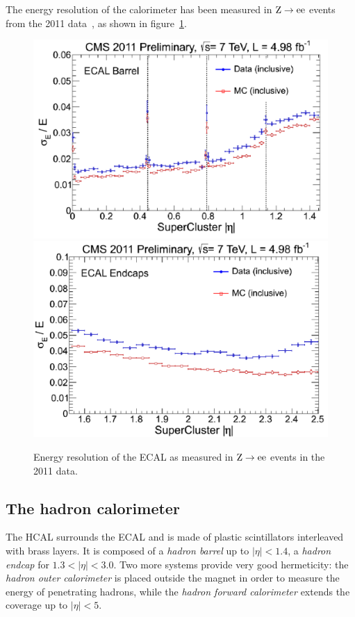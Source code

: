 The energy resolution of the calorimeter has been measured in $\mathrm{Z}
\rightarrow \mathrm{e}\mathrm{e}$ events from the 2011 data~\cite{CMS-DP-2012-007}, as shown in
figure~\ref{fig:ecal_resolution}.

\begin{figure}[htb]
    \centering
    \includegraphics[width=.48\textwidth]{images/pdf/ecal_barrel_resolution}
    \includegraphics[width=.48\textwidth]{images/pdf/ecal_endcap_resolution}
    \caption{Energy resolution of the ECAL as measured in $\mathrm{Z} \rightarrow
    \mathrm{e}\mathrm{e}$ events in the 2011 data.}
    \label{fig:ecal_resolution}
\end{figure}

\subsection{The hadron calorimeter}
The HCAL surrounds the ECAL and is made of plastic scintillators interleaved with brass layers.
It is composed of a \emph{hadron barrel} up to $|\eta| < 1.4$, a
\emph{hadron endcap} for $1.3 < |\eta| < 3.0$. Two more systems provide
very good hermeticity: the \emph{hadron outer calorimeter} is placed
outside  the magnet in order to measure the energy of penetrating hadrons,
while the \emph{hadron forward calorimeter} extends the coverage up to
$|\eta| < 5$.
